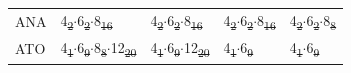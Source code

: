 \documentclass[preprint,numrefs,noinfo,sort&compress]{elsarticle}
\providecommand{\DIFadd}[1]{{\protect\color{blue}\uwave{#1}}} %
\providecommand{\DIFdel}[1]{{\protect\color{red}\sout{#1}}}                      %
\providecommand{\DIFaddFL}[1]{\DIFadd{#1}} %
\providecommand{\DIFdelFL}[1]{\DIFdel{#1}} %
\providecommand{\DIFaddbeginFL}{} %
\providecommand{\DIFaddendFL}{} %
\providecommand{\DIFdelbeginFL}{} %
\providecommand{\DIFdelendFL}{} %
\newcommand{\DIFscaledelfig}{0.5}
\newlength{\DIFdelgraphicswidth} %
\newlength{\DIFdelgraphicsheight} %
\newcommand{\DIFaddincludegraphics}[2][]{{\color{blue}\fbox{\DIFOincludegraphics[#1]{#2}}}} %
\newcommand{\DIFdelincludegraphics}[2][]{%
\sbox{\DIFdelgraphicsbox}{\DIFOincludegraphics[#1]{#2}}%
\settoboxwidth{\DIFdelgraphicswidth}{\DIFdelgraphicsbox} %
\settoboxtotalheight{\DIFdelgraphicsheight}{\DIFdelgraphicsbox} %
\scalebox{\DIFscaledelfig}{%
\parbox[b]{\DIFdelgraphicswidth}{\usebox{\DIFdelgraphicsbox}\\[-\baselineskip] \rule{\DIFdelgraphicswidth}{0em}}\llap{\resizebox{\DIFdelgraphicswidth}{\DIFdelgraphicsheight}{%
\setlength{\unitlength}{\DIFdelgraphicswidth}%
\begin{picture}(1,1)%
\thicklines\linethickness{2pt} %
{\color[rgb]{1,0,0}\put(0,0){\framebox(1,1){}}}%
{\color[rgb]{1,0,0}\put(0,0){\line( 1,1){1}}}%
{\color[rgb]{1,0,0}\put(0,1){\line(1,-1){1}}}%
\end{picture}%
}\hspace*{3pt}}} %
} %
\DeclareRobustCommand{\DIFaddbeginFL}{\DIFOaddbeginFL \let\includegraphics\DIFaddincludegraphics} %
\DeclareRobustCommand{\DIFaddendFL}{\DIFOaddendFL \let\includegraphics\DIFOincludegraphics} %
\DeclareRobustCommand{\DIFdelbeginFL}{\DIFOdelbeginFL \let\includegraphics\DIFdelincludegraphics} %
\DeclareRobustCommand{\DIFdelendFL}{\DIFOaddendFL \let\includegraphics\DIFOincludegraphics} %
\begin{document}
\begin{table}
\begin{threeparttable}
{\begin{tabular}{lllll}
ANA & 4\DIFdelbeginFL \DIFdelFL{\textsubscript{2}\(\cdot\)}\DIFdelendFL \DIFaddbeginFL \DIFaddFL{\(_{\text{2}} \cdot\)}\DIFaddendFL 6\DIFdelbeginFL \DIFdelFL{\textsubscript{2}\(\cdot\)}\DIFdelendFL \DIFaddbeginFL \DIFaddFL{\(_{\text{2}} \cdot\)}\DIFaddendFL 8\DIFdelbeginFL \DIFdelFL{\textsubscript{16} }\DIFdelendFL \DIFaddbeginFL \DIFaddFL{\(_{\text{16}}\) }\DIFaddendFL & 4\DIFdelbeginFL \DIFdelFL{\textsubscript{2}\(\cdot\)}\DIFdelendFL \DIFaddbeginFL \DIFaddFL{\(_{\text{2}} \cdot\)}\DIFaddendFL 6\DIFdelbeginFL \DIFdelFL{\textsubscript{2}\(\cdot\)}\DIFdelendFL \DIFaddbeginFL \DIFaddFL{\(_{\text{2}} \cdot\)}\DIFaddendFL 8\DIFdelbeginFL \DIFdelFL{\textsubscript{16} }\DIFdelendFL \DIFaddbeginFL \DIFaddFL{\(_{\text{16}}\) }\DIFaddendFL & 4\DIFdelbeginFL \DIFdelFL{\textsubscript{2}\(\cdot\)}\DIFdelendFL \DIFaddbeginFL \DIFaddFL{\(_{\text{2}} \cdot\)}\DIFaddendFL 6\DIFdelbeginFL \DIFdelFL{\textsubscript{2}\(\cdot\)}\DIFdelendFL \DIFaddbeginFL \DIFaddFL{\(_{\text{2}} \cdot\)}\DIFaddendFL 8\DIFdelbeginFL \DIFdelFL{\textsubscript{16} }\DIFdelendFL \DIFaddbeginFL \DIFaddFL{\(_{\text{16}}\) }\DIFaddendFL & 4\DIFdelbeginFL \DIFdelFL{\textsubscript{2}\(\cdot\)}\DIFdelendFL \DIFaddbeginFL \DIFaddFL{\(_{\text{2}} \cdot\)}\DIFaddendFL 6\DIFdelbeginFL \DIFdelFL{\textsubscript{2}\(\cdot\)}\DIFdelendFL \DIFaddbeginFL \DIFaddFL{\(_{\text{2}} \cdot\)}\DIFaddendFL 8\DIFdelbeginFL \DIFdelFL{\textsubscript{8}}\DIFdelendFL \DIFaddbeginFL \DIFaddFL{\(_{\text{8}}\)}\DIFaddendFL \\
ATO & 4\DIFdelbeginFL \DIFdelFL{\textsubscript{1}\(\cdot\)}\DIFdelendFL \DIFaddbeginFL \DIFaddFL{\(_{\text{1}} \cdot\)}\DIFaddendFL 6\DIFdelbeginFL \DIFdelFL{\textsubscript{9}\(\cdot\)}\DIFdelendFL \DIFaddbeginFL \DIFaddFL{\(_{\text{9}} \cdot\)}\DIFaddendFL 8\DIFdelbeginFL \DIFdelFL{\textsubscript{8}\(\cdot\)}\DIFdelendFL \DIFaddbeginFL \DIFaddFL{\(_{\text{8}} \cdot\)}\DIFaddendFL 12\DIFdelbeginFL \DIFdelFL{\textsubscript{20} }\DIFdelendFL \DIFaddbeginFL \DIFaddFL{\(_{\text{20}}\) }\DIFaddendFL & 4\DIFdelbeginFL \DIFdelFL{\textsubscript{1}\(\cdot\)}\DIFdelendFL \DIFaddbeginFL \DIFaddFL{\(_{\text{1}} \cdot\)}\DIFaddendFL 6\DIFdelbeginFL \DIFdelFL{\textsubscript{9}\(\cdot\)}\DIFdelendFL \DIFaddbeginFL \DIFaddFL{\(_{\text{9}} \cdot\)}\DIFaddendFL 12\DIFdelbeginFL \DIFdelFL{\textsubscript{20} }\DIFdelendFL \DIFaddbeginFL \DIFaddFL{\(_{\text{20}}\) }\DIFaddendFL & 4\DIFdelbeginFL \DIFdelFL{\textsubscript{1}\(\cdot\)}\DIFdelendFL \DIFaddbeginFL \DIFaddFL{\(_{\text{1}} \cdot\)}\DIFaddendFL 6\DIFdelbeginFL \DIFdelFL{\textsubscript{9} }\DIFdelendFL \DIFaddbeginFL \DIFaddFL{\(_{\text{9}}\) }\DIFaddendFL & 4\DIFdelbeginFL \DIFdelFL{\textsubscript{1}\(\cdot\)}\DIFdelendFL \DIFaddbeginFL \DIFaddFL{\(_{\text{1}} \cdot\)}\DIFaddendFL 6\DIFdelbeginFL \DIFdelFL{\textsubscript{9}}\DIFdelendFL \DIFaddbeginFL \DIFaddFL{\(_{\text{9}}\)}\DIFaddendFL \\

\end{tabular}}
\end{threeparttable}
\end{table}
\end{document}
